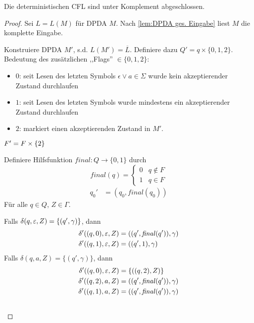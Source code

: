 \begin{Satz}[name={[Abgeschlossenheit der deterministischen \acs*{CFL}]}]
        Die deterministischen \ac{CFL} sind unter Komplement abgeschlossen.
\end{Satz}
\begin{proof}
  Sei $L=L(M)$ für \ac{DPDA} $M$. Nach \autoref{lem:DPDA ges. Eingabe} liest $M$ die komplette Eingabe. 

  Konstruiere \ac{DPDA} $M'$, s.d. $ L(M') = \overline{L}$. 
  Definiere dazu $Q'= q \times \{0,1,2\}$. Bedeutung des zusätzlichen ,,Flags'' $\in \{0,1,2\}$:
  \begin{itemize}
  \item $0$: seit Lesen des letzten Symbols $\epsilon \vee a \in \Sigma$ wurde kein akzeptierender Zustand durchlaufen
  \item $1$: seit Lesen des letzten Symbols wurde mindestens ein
    akzeptierender Zustand durchlaufen 
  \item $2$: markiert einen akzeptierenden Zustand in $M'$.
  \end{itemize}
        
  $F'=F\times \{2\}$

  Definiere Hilfsfunktion $\mathit{final}:Q\to \{0,1\}$ durch 
  \begin{displaymath}
    \mathit{final} (q) =
    \begin{cases}
      0 & q\notin F \\ 1 & q \in F
    \end{cases}
  \end{displaymath}
  \begin{align*}
    q_0' &= (q_0,\mathit{final} (q_0))
  \end{align*}
  Für alle $q \in Q$, $Z\in\Gamma$.
  
  Falls $\delta(q,\varepsilon,Z) = \{(q',\gamma)\}$, dann
  \begin{align*}
    \delta'((q,0),\varepsilon,Z) &= ((q',\mathit{final} (q')),\gamma)
    \\
    \delta'((q,1),\varepsilon,Z) &= ((q',1),\gamma)
  \end{align*}
  Falls $\delta(q,a,Z) = \{(q',\gamma)\}$, dann
  \begin{align*}
    \delta'((q,0), \Eps, Z) &= \{ ((q,2), Z) \} \\
    \delta'((q,2), a, Z) &=((q',\mathit{final} (q')), \gamma)
    \\
    \delta'((q,1), a, Z) &=
    ((q',\mathit{final} (q')), \gamma)
    \\ \tag*{\qedhere}    %
  \end{align*}
\end{proof}
